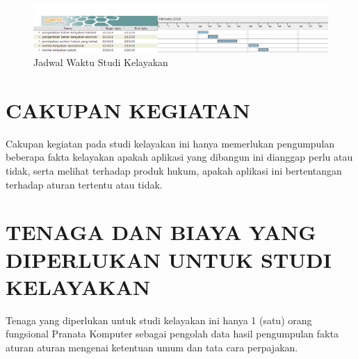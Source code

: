 \documentclass[pdftex,12pt, oneside]{article}
\begin{document}
\begin{figure}[H]
  \centering
  \includegraphics[width=1\textwidth]{./resources/gantt-jadwal-waktu}
  \caption{Jadwal Waktu Studi Kelayakan}
\end{figure}

\section{CAKUPAN KEGIATAN}

Cakupan kegiatan pada studi kelayakan ini hanya memerlukan pengumpulan beberapa fakta kelayakan apakah aplikasi yang dibangun ini dianggap perlu atau tidak, serta melihat terhadap produk hukum, apakah aplikasi ini bertentangan terhadap aturan tertentu atau tidak.

\section{TENAGA DAN BIAYA YANG DIPERLUKAN UNTUK STUDI KELAYAKAN}

Tenaga yang diperlukan untuk studi kelayakan ini hanya 1 (satu) orang fungsional Pranata Komputer sebagai pengolah data hasil pengumpulan fakta aturan aturan mengenai ketentuan umum dan tata cara perpajakan.
\end{document}
